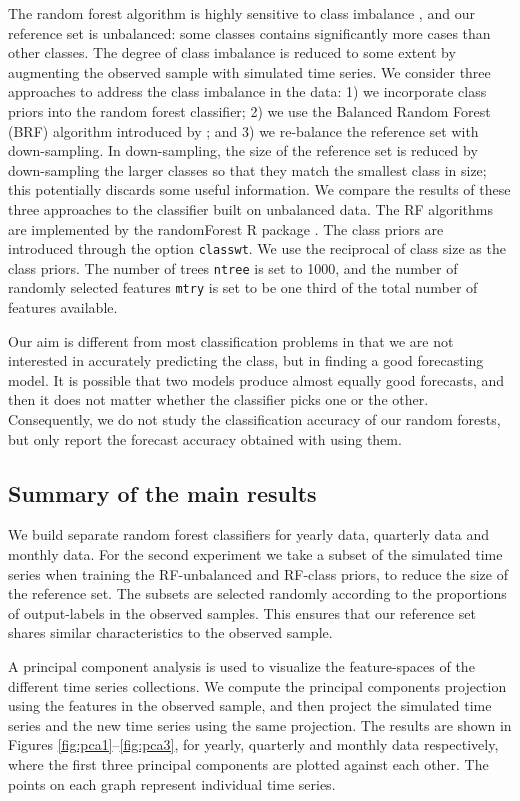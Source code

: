 \documentclass[11pt,a4paper,]{article}
\theoremstyle{definition}
\theoremstyle{definition}
\theoremstyle{definition}
\theoremstyle{remark}
\begin{document}
The random forest algorithm is highly sensitive to class imbalance
\autocite{breiman2001random}, and our reference set is unbalanced: some
classes contains significantly more cases than other classes. The degree
of class imbalance is reduced to some extent by augmenting the observed
sample with simulated time series. We consider three approaches to
address the class imbalance in the data: 1) we incorporate class priors
into the random forest classifier; 2) we use the Balanced Random Forest
(BRF) algorithm introduced by \textcite{chen2004using}; and 3) we
re-balance the reference set with down-sampling. In down-sampling, the
size of the reference set is reduced by down-sampling the larger classes
so that they match the smallest class in size; this potentially discards
some useful information. We compare the results of these three
approaches to the classifier built on unbalanced data. The RF algorithms
are implemented by the randomForest R package
\autocite{liaw2002randomforest}. The class priors are introduced through
the option \texttt{classwt}. We use the reciprocal of class size as the
class priors. The number of trees \texttt{ntree} is set to 1000, and the
number of randomly selected features \texttt{mtry} is set to be one
third of the total number of features available.

Our aim is different from most classification problems in that we are
not interested in accurately predicting the class, but in finding a good
forecasting model. It is possible that two models produce almost equally
good forecasts, and then it does not matter whether the classifier picks
one or the other. Consequently, we do not study the classification
accuracy of our random forests, but only report the forecast accuracy
obtained with using them.

\subsection{Summary of the main results}\label{sec:results}

We build separate random forest classifiers for yearly data, quarterly
data and monthly data. For the second experiment we take a subset of the
simulated time series when training the RF-unbalanced and RF-class
priors, to reduce the size of the reference set. The subsets are
selected randomly according to the proportions of output-labels in the
observed samples. This ensures that our reference set shares similar
characteristics to the observed sample.

A principal component analysis is used to visualize the feature-spaces
of the different time series collections. We compute the principal
components projection using the features in the observed sample, and
then project the simulated time series and the new time series using the
same projection. The results are shown in Figures
\ref{fig:pca1}--\ref{fig:pca3}, for yearly, quarterly and monthly data
respectively, where the first three principal components are plotted
against each other. The points on each graph represent individual time
series.
\end{document}
